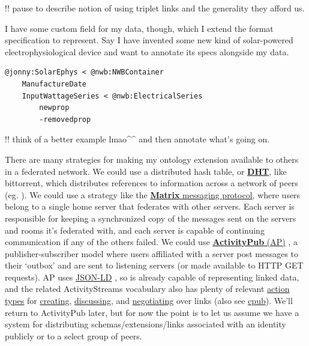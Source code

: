 \documentclass[10pt]{article}
\begin{document}
\begin{multicols}{2}
!! pause to describe notion of using triplet links and the generality
they afford us.

I have some custom field for my data, though, which I extend the format
specification to represent. Say I have invented some new kind of
solar-powered electrophysiological device and want to annotate its specs
alongside my data.

\begin{verbatim}
@jonny:SolarEphys < @nwb:NWBContainer
    ManufactureDate
    InputWattageSeries < @nwb:ElectricalSeries
        newprop
        -removedprop
\end{verbatim}

!! think of a better example lmao\^{}\^{} and then annotate what's going
on.

There are many strategies for making my ontology extension available to
others in a federated network. We could use a distributed hash table, or
\href{https://en.wikipedia.org/wiki/Distributed_hash_table}{\textbf{DHT}},
like bittorrent, which distributes references to information across a
network of peers (eg. \cite{pirroDHTbasedSemanticOverlay2012} ).
We could use a strategy like the
\href{https://matrix.org/}{\textbf{Matrix} messaging protocol}, where
users belong to a single home server that federates with other servers.
Each server is responsible for keeping a synchronized copy of the
messages sent on the servers and rooms it's federated with, and each
server is capable of continuing communication if any of the others
failed. We could use
\href{https://www.w3.org/TR/2018/REC-activitypub-20180123/}{\textbf{ActivityPub}
(AP)} \cite{Webber:18:A} , a publisher-subscriber model where
users affiliated with a server post messages to their `outbox' and are
sent to listening servers (or made available to HTTP GET requests). AP
uses \href{https://json-ld.org/}{JSON-LD} \cite{spornyJSONLDJSONbasedSerialization2020} , so is already capable of
representing linked data, and the related ActivityStreams vocabulary
\cite{snellActivityStreams2017}  also has plenty of relevant
\href{https://www.w3.org/TR/activitystreams-vocabulary/\#activity-types}{action
types} for
\href{https://www.w3.org/TR/activitystreams-vocabulary/\#dfn-create}{creating},
\href{https://www.w3.org/TR/activitystreams-vocabulary/\#dfn-question}{discussing},
and
\href{https://www.w3.org/TR/activitystreams-vocabulary/\#dfn-tentativeaccept}{negotiating}
over links (also see
\href{https://github.com/openEngiadina/cpub}{cpub}). We'll return to
ActivityPub later, but for now the point is to let us assume we have a
system for distributing schemas/extensions/links associated with an
identity publicly or to a select group of peers.


\end{multicols}
\end{document}
